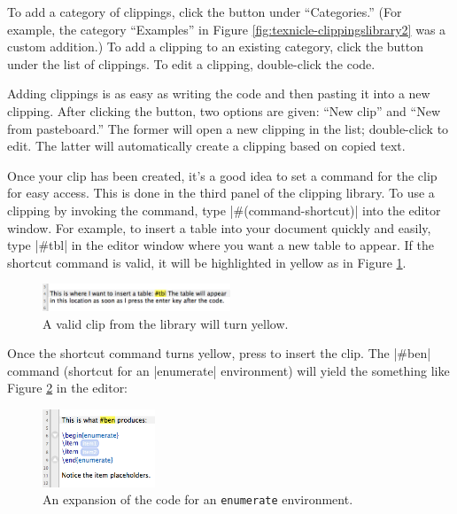 To add a category of clippings, click the \menu{+} button under ``Categories.'' (For example, the category ``Examples'' in Figure \ref{fig:texnicle-clippingslibrary2} was a custom addition.) To add a clipping to an existing category, click the \menu{+} button under the list of clippings. To edit a clipping, double-click the code.

Adding clippings is as easy as writing the code and then pasting it into a new clipping. After clicking the \menu{+} button, two options are given: ``New clip'' and ``New from pasteboard.'' The former will open a new clipping in the list; double-click to edit. The latter will automatically create a clipping based on copied text.

Once your clip has been created, it's a good idea to set a command for the clip for easy access. This is done in the third panel of the clipping library. To use a clipping by invoking the command, type |#(command-shortcut)| into the editor window. For example, to insert a table into your document quickly and easily, type |#tbl| in the editor window where you want a new table to appear. If the shortcut command is valid, it will be highlighted in yellow as in Figure \ref{fig:texnicle-validclip}.


\begin{figure}[htbp]
\centering
\includegraphics[width=0.5\textwidth]{TeXnicle-Images/texnicle-validclip.png}
\caption{A valid clip from the library will turn yellow.}
\label{fig:texnicle-validclip}
\end{figure}


Once the shortcut command turns yellow, press \keys{\returnkey} to insert the clip. The |#ben| command (shortcut for an |enumerate| environment) will yield the something like Figure \ref{fig:texnicle-expandedben} in the editor:
\begin{figure}[htbp]
\centering
\includegraphics[width=0.3\textwidth]{TeXnicle-Images/texnicle-expandedben.png}
\caption{An expansion of the code for an \texttt{enumerate} environment.}
\label{fig:texnicle-expandedben}
\end{figure}

